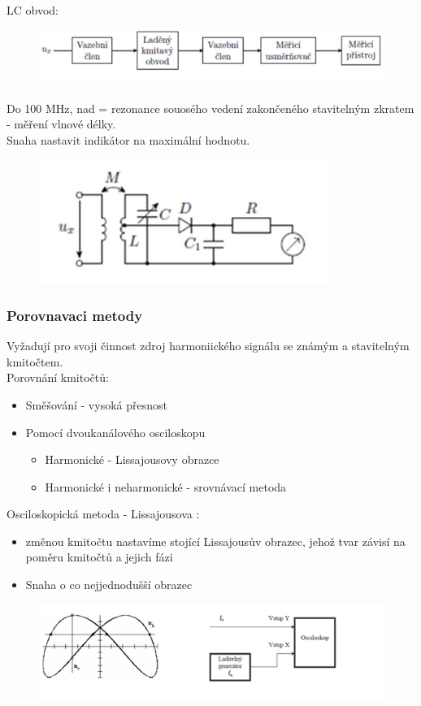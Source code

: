 LC obvod:
\begin{figure}[H]
    \includegraphics*[scale = 1.3]{images/LCObvod.png}
\end{figure}
Do 100 MHz, nad = rezonance souosého vedení zakončeného stavitelným zkratem - měření vlnové délky.\\
Snaha nastavit indikátor na maximální hodnotu.\\
\begin{figure}[H]%
    \centering
    \includegraphics*[scale = 1.2]{images/indikatorMax.png}
\end{figure}

\subsubsection*{Porovnavaci metody}
Vyžadují pro svoji činnost zdroj harmoniického signálu se známým a stavitelným kmitočtem.\\
Porovnání kmitočtů:
\begin{itemize}
    \item Směšování - vysoká přesnost
    \item Pomocí dvoukanálového osciloskopu
    \begin{itemize}
        \item Harmonické - Lissajousovy obrazce 
        \item Harmonické i neharmonické - srovnávací metoda
    \end{itemize}
\end{itemize}

Osciloskopická metoda - Lissajousova :\\
\begin{itemize}
    \item změnou kmitočtu nastavíme stojící Lissajousův obrazec, jehož tvar závisí na poměru kmitočtů a jejich fázi 
    \item Snaha o co nejjednodušší obrazec
\end{itemize}
\begin{figure}[H]
    \includegraphics*[scale = 1]{images/Lissajous1.png}
\end{figure}

